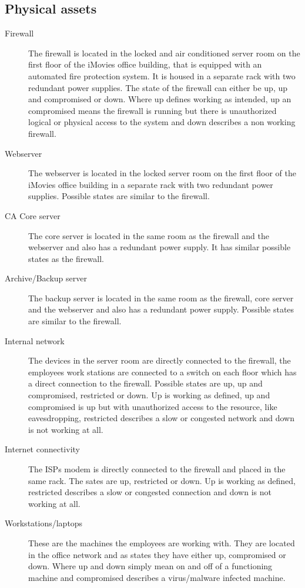 \documentclass[a4paper, toc=index, 12pt, DIV14, twoside, BCOR2cm, headsepline, numbers=noenddot, bibliography=totoc]{report}
\begin{document}
\subsection{Physical assets}
\begin{description}
\item[Firewall ] The firewall is located in the locked and air conditioned server room on the first floor of the iMovies office building, that is equipped with an automated fire protection system. It is housed in a separate rack with two redundant power supplies. The state of the firewall can either be up, up and compromised or down. Where up defines working as intended, up an compromised means the firewall is running but there is unauthorized logical or physical access to the system and down describes a non working firewall.
\item[Webserver ] The webserver is located in the locked server room on the first floor of the iMovies office building in a separate rack with two redundant power supplies. Possible states are similar to the firewall.
\item[CA Core server ] The core server is located in the same room as the firewall and the webserver and also has a redundant power supply. It has similar possible states as the firewall.
\item[Archive/Backup server ] The backup server is located in the same room as the firewall, core server and the webserver and also has a redundant power supply. Possible states are similar to the firewall.
\item[Internal network ] The devices in the server room are directly connected to the firewall, the employees work stations are connected to a switch on each floor which has a direct connection to the firewall. Possible states are up, up and compromised, restricted or down. Up is working as defined, up and compromised is up but with unauthorized access to the resource, like eavesdropping, restricted describes a slow or congested network and down is not working at all.
\item[Internet connectivity ] The ISPs modem is directly connected to the firewall and placed in the same rack. The sates are up, restricted or down. Up is working as defined, restricted describes a slow or congested connection and down is not working at all.
\item[Workstations/laptops ] These are the machines the employees are working with. They are located in the office network and as states they have either up, compromised or down. Where up and down simply mean on and off of a functioning machine and compromised describes a virus/malware infected machine.
\end{description}
\end{document}

